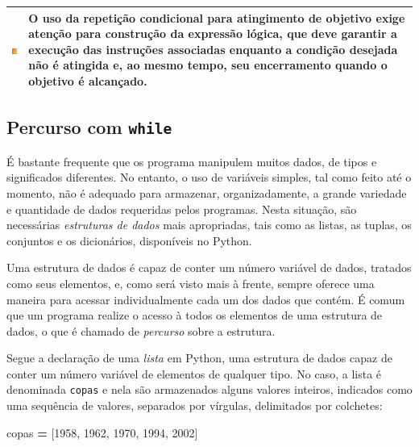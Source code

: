 \documentclass[
]{book}
\newenvironment{Shaded}{\begin{snugshade}}{\end{snugshade}}
\newcommand{\DecValTok}[1]{\textcolor[rgb]{0.00,0.00,0.81}{#1}}
\newcommand{\NormalTok}[1]{#1}
\newcommand{\OperatorTok}[1]{\textcolor[rgb]{0.81,0.36,0.00}{\textbf{#1}}}
\begin{document}
\begin{longtable}[]{@{}
  >{\centering\arraybackslash}p{}
  >{\raggedright\arraybackslash}p{}@{}}
\toprule
\includegraphics{images/warn.png} & O uso da repetição condicional para atingimento de objetivo exige atenção para construção da expressão lógica, que deve garantir a execução das instruções associadas enquanto a condição desejada não é atingida e, ao mesmo tempo, seu encerramento quando o objetivo é alcançado. \\
\midrule
\endhead
\bottomrule
\end{longtable}

\hypertarget{repet-while-percu}{%
\subsection{\texorpdfstring{Percurso com \texttt{while}}{Percurso com while}}\label{repet-while-percu}}

É bastante frequente que os programa manipulem muitos dados, de tipos e significados diferentes. No entanto, o uso de variáveis simples, tal como feito até o momento, não é adequado para armazenar, organizadamente, a grande variedade e quantidade de dados requeridas pelos programas. Nesta situação, são necessárias \emph{estruturas de dados} mais apropriadas, tais como as listas, as tuplas, os conjuntos e os dicionários, disponíveis no Python.

Uma estrutura de dados é capaz de conter um número variável de dados, tratados como seus elementos, e, como será visto mais à frente, sempre oferece uma maneira para acessar individualmente cada um dos dados que contém. É comum que um programa realize o acesso à todos os elementos de uma estrutura de dados, o que é chamado de \emph{percurso} sobre a estrutura.

Segue a declaração de uma \emph{lista} em Python, uma estrutura de dados capaz de conter um número variável de elementos de qualquer tipo. No caso, a lista é denominada \texttt{copas} e nela são armazenados alguns valores inteiros, indicados como uma sequência de valores, separados por vírgulas, delimitados por colchetes:

\begin{Shaded}
\begin{Highlighting}[]
\NormalTok{copas }\OperatorTok{=}\NormalTok{ [}\DecValTok{1958}\NormalTok{, }\DecValTok{1962}\NormalTok{, }\DecValTok{1970}\NormalTok{, }\DecValTok{1994}\NormalTok{, }\DecValTok{2002}\NormalTok{]}
\end{Highlighting}
\end{Shaded}
\end{document}
